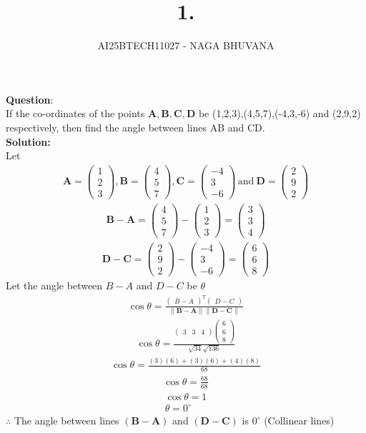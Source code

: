 \documentclass{beamer}
\title{1.}
\author{AI25BTECH11027 - NAGA BHUVANA}
\theoremstyle{remark}
\newcommand{\myvec}[1]{\ensuremath{\begin{pmatrix}#1\end{pmatrix}}}
\let\vec\mathbf
\numberwithin{equation}{section}
\begin{document}
{\let\newpage\relax\maketitle}
\renewcommand{\thefigure}{\theenumi}
\renewcommand{\thetable}{\theenumi}
   \noindent
		\textbf{Question}:\\
        If the co-ordinates of the points $\vec{A},\vec{B},\vec{C},\vec{D}$ be (1,2,3),(4,5,7),(-4,3,-6) and (2,9,2) respectively, then find the angle between lines AB and CD.\\
\textbf{Solution:}\\
Let 
\begin{align}
    \vec{A}=\myvec{1\\2\\3},\vec{B}=\myvec{4\\5\\7},\vec{C}=\myvec{-4\\3\\-6} \, \text{and} \:  \vec{D}=\myvec{2\\9\\2}
\end{align}
\begin{align}
    \vec{B-A}=\myvec{4\\5\\7}-\myvec{1\\2\\3}=\myvec{3\\3\\4}
\end{align}	
\begin{align}
    \vec{D-C}=\myvec{2\\9\\2}-\myvec{-4\\3\\-6}=\myvec{6\\6\\8}
\end{align}
Let the angle between $B-A$ and $D-C$ be $\theta$
\begin{align}
    \cos{\theta}=\frac{\myvec{B-A}^T \myvec{D-C}}{\|\vec{B-A}\| \|\vec{D-C}\|}
\end{align}
\begin{align}
    \cos{\theta}=\frac{\myvec{3 & 3 & 4}\myvec{6\\6\\8}}{\sqrt{34}\sqrt{136}}
\end{align}
\begin{align}
    \cos{\theta}=\frac{(3)(6)+(3)(6)+(4)(8)}{68}
\end{align}
\begin{align}
    \cos{\theta}=\frac{68}{68}
\end{align}
\begin{align}
    \cos{\theta}=1\\
    \theta=0^\circ
\end{align}
$\therefore$ The angle between lines $\vec{(B-A)}$ and $\vec{(D-C)}$ is $0^\circ$ (Collinear lines)
\end{document}
